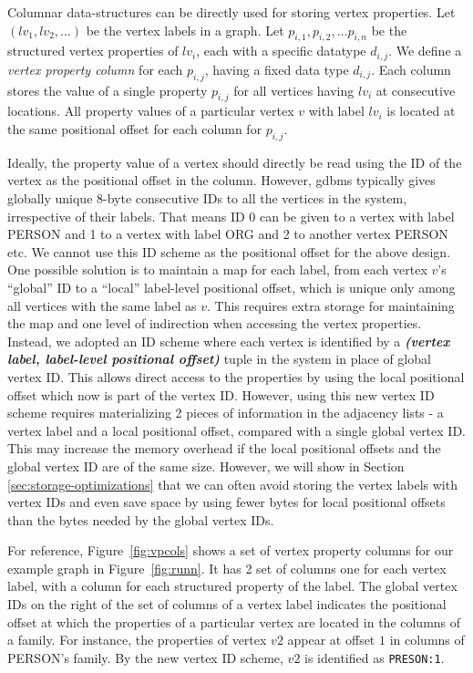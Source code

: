 Columnar data-structures can be directly used for storing vertex properties. Let $(lv_1, lv_2, ...)$ be the vertex labels in a graph. Let $p_{i,1},  p_{i,2}, ... p_{i, n}$ be the structured vertex properties of $lv_i$, each with a specific datatype $d_{i,j}$. We define a \emph{vertex property column} for each $p_{i,j}$, having a fixed data type $d_{i,j}$. Each column stores the value of a single property $p_{i,j}$ for all vertices having $lv_i$ at consecutive locations. All property values of a particular vertex $v$ with label $lv_i$ is located at the same positional offset for each column for $p_{i,j}$. 


Ideally, the property value of a vertex should directly be read using the ID of the vertex as the positional offset in the column. However, \gls{gdbms} typically gives globally unique 8-byte consecutive IDs to all the vertices in the system, irrespective of their labels. That means ID 0 can be given to a vertex with label PERSON and 1 to a vertex with label ORG and 2 to another vertex PERSON etc. We cannot use this ID scheme as the positional offset for the above design. One possible solution is to maintain a map for each label, from each vertex $v$'s \enquote{global} ID to a \enquote{local} label-level positional offset, which is unique only among all vertices with the same label as $v$. This requires extra storage for maintaining the map and one level of indirection when accessing the vertex properties. Instead, we adopted an ID scheme where each vertex is identified by a \emph{\textbf{(vertex label, label-level positional offset)}} tuple in the system in place of global vertex ID. This allows direct access to the properties by using the local positional offset which now is part of the vertex ID. However, using this new vertex ID scheme requires materializing 2 pieces of information in the adjacency lists - a vertex label and a local positional offset, compared with a single global vertex ID. This may increase the memory overhead  if the local positional offsets and the global vertex ID are of the same size. However, we will show in Section \ref{sec:storage-optimizations} that we can often avoid storing the vertex labels with vertex IDs and even save space by using fewer bytes for local positional offsets than the bytes needed by the global vertex IDs.

For reference, Figure~\ref{fig:vpcols} shows a set of vertex property columns for our example graph in Figure~\ref{fig:runn}. It has 2 set of columns one for each vertex label, with a column for each structured property of the label. The global vertex IDs on the right of the set of columns of a vertex label indicates the positional offset at which the properties of a particular vertex are located in the columns of a family. For instance, the properties of vertex $v2$ appear at offset $1$ in columns of PERSON's family. By the new vertex ID scheme, $v2$ is identified as \texttt{PRESON:1}. 



